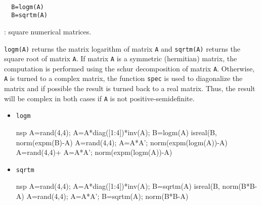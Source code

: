 \begin{mandesc}
   \\ %
\end{mandesc}
\begin{calling_sequence}
\begin{verbatim}
  B=logm(A)  
  B=sqrtm(A)  
\end{verbatim}
\end{calling_sequence}
\begin{parameters}
  \begin{varlist}
    : square numerical matrices.
  \end{varlist}
\end{parameters}
\begin{mandescription}
  \verb!logm(A)! returns the matrix logarithm of matrix \verb!A! and 
  \verb!sqrtm(A)! returns the square root of matrix \verb!A!. 
  If matrix \verb!A! is a symmetric (hermitian) matrix, the 
  computation is performed using the schur decomposition of matrix \verb!A!.
  Otherwise, \verb!A! is turned to a complex matrix, the function 
  \verb!spec! is used to diagonalize the matrix and if possible 
  the result is turned back to a real matrix. Thus, the result will be 
  complex in both cases  if \verb!A! is not positive-semidefinite.
\end{mandescription}
\begin{examples}
\begin{itemize}
  \item \verb!logm!
  \begin{mintednsp}{nsp}
    A=rand(4,4); 
    A=A*diag([1:4])*inv(A);
    B=logm(A)
    isreal(B,%
    norm(expm(B)-A)
    A=rand(4,4);
    A=A*A';
    norm(expm(logm(A))-A)
    A=rand(4,4)+%
    A=A*A';
    norm(expm(logm(A))-A)
  \end{mintednsp}
  \item \verb!sqrtm!
  \begin{mintednsp}{nsp}
    A=rand(4,4); 
    A=A*diag([1:4])*inv(A);
    B=sqrtm(A)
    isreal(B,%
    norm(B*B-A)
    A=rand(4,4); A=A*A';
    B=sqrtm(A);
    norm(B*B-A)
  \end{mintednsp}
\end{itemize}
\end{examples}
\begin{manseealso}
       
\end{manseealso}
